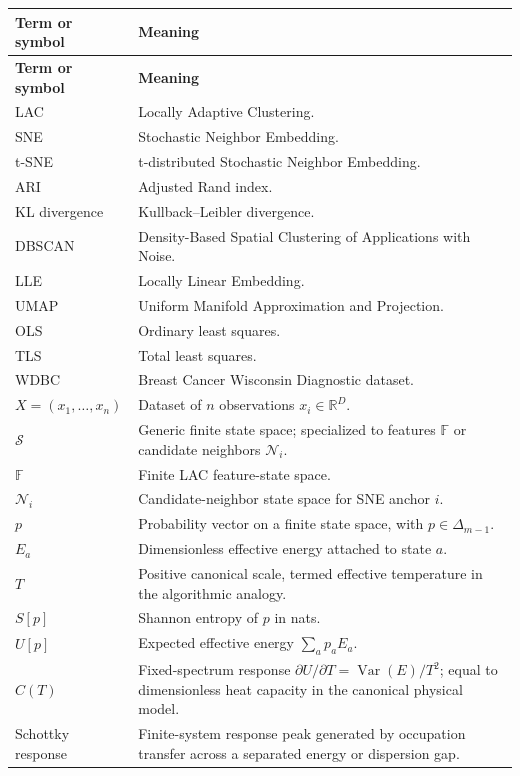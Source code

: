 \documentclass[11pt,a4paper]{article}
\theoremstyle{definition}
\theoremstyle{plain}
\begin{document}
\begin{longtable}{>{\raggedright\arraybackslash}p{} >{\raggedright\arraybackslash}p{}}
\toprule
\textbf{Term or symbol} & \textbf{Meaning}\\
\midrule
\endfirsthead
\toprule
\textbf{Term or symbol} & \textbf{Meaning}\\
\midrule
\endhead
LAC & Locally Adaptive Clustering.\\
SNE & Stochastic Neighbor Embedding.\\
t-SNE & t-distributed Stochastic Neighbor Embedding.\\
ARI & Adjusted Rand index.\\
KL divergence & Kullback--Leibler divergence.\\
DBSCAN & Density-Based Spatial Clustering of Applications with Noise.\\
LLE & Locally Linear Embedding.\\
UMAP & Uniform Manifold Approximation and Projection.\\
OLS & Ordinary least squares.\\
TLS & Total least squares.\\
WDBC & Breast Cancer Wisconsin Diagnostic dataset.\\
$X=(x_1,\ldots,x_n)$ & Dataset of $n$ observations $x_i\in\mathbb R^D$.\\
$\mathcal S$ & Generic finite state space; specialized to features $\mathbb F$ or candidate neighbors $\mathcal N_i$.\\
$\mathbb F$ & Finite LAC feature-state space.\\
$\mathcal N_i$ & Candidate-neighbor state space for SNE anchor $i$.\\
$p$ & Probability vector on a finite state space, with $p\in\Delta_{m-1}$.\\
$E_a$ & Dimensionless effective energy attached to state $a$.\\
$T$ & Positive canonical scale, termed effective temperature in the algorithmic analogy.\\
$S[p]$ & Shannon entropy of $p$ in nats.\\
$U[p]$ & Expected effective energy $\sum_a p_aE_a$.\\
$C(T)$ & Fixed-spectrum response $\partial U/\partial T=\operatorname{Var}(E)/T^2$; equal to dimensionless heat capacity in the canonical physical model.\\
Schottky response & Finite-system response peak generated by occupation transfer across a separated energy or dispersion gap.\\

\end{longtable}
\end{document}
